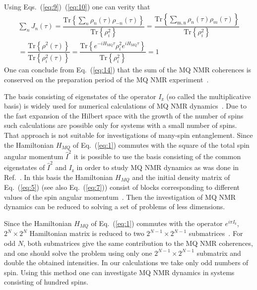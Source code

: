 \documentclass[review]{elsarticle}
\begin{document}
%
Using Eqs.~(\ref{eq:9})~(\ref{eq:10}) one can verity that 
%
\begin{multline}
    \label{eq:14}
    \sum\limits_{n} J_{n}(\tau)
    = \dfrac{
        \mathrm{Tr} \left\{
            \sum_{n} \rho_{n}(\tau) \rho_{-n}(\tau)
        \right\}}
    {\mathrm{Tr} \left\{ \rho^2_{i} \right\}} 
    = \dfrac{
        \mathrm{Tr} \left\{
            \sum_{\mathrm{m,n}} \rho_n(\tau)\rho_m(\tau)
    \right\}}
    {\mathrm{Tr} \left\{\rho^2_{i}\right\}}
    \\
    = \dfrac{
        \mathrm{Tr}\left\{\rho^2(\tau)\right\}
    }
    {
        \mathrm{Tr}\left\{\rho^2_{i}(\tau)\right\}
    }
    = \dfrac{
        \mathrm{Tr} \left\{ 
            e^{-i H_\mathrm{MQ} \tau} 
            \rho^{2}_{i}
            e^{i H_\mathrm{MQ} \tau} 
        \right\}
    }
    {
        \mathrm{Tr} \left\{ \rho_{i}^{2} \right\}
    } 
    = 1
\end{multline}
%
One can conclude from Eq.~(\ref{eq:14}) that the sum of the MQ NMR coherences is conserved on the preparation period of the MQ NMR experiment~\cite{Baum_1985}.

The basis consisting of eigenstates of the operator $I_\mathrm{z}$ (so called the multiplicative basis) is widely used for numerical calculations of MQ NMR dynamics~\cite{Zhang_2009}.
Due to the fast expansion of the Hilbert space with the growth of the number of spins such calculations are possible only for systems with a small number of spins.
That approach is not suitable for investigations of many-spin entanglement.
Since the Hamiltonian $H_{MQ}$ of Eq.~(\ref{eq:1}) commutes with the square of the total spin angular momentum $\hat I^2$ 
it is possible to use the basis consisting of the common eigenstates of $\hat I^2$ and $I_\mathrm{z}$ in order to study MQ NMR dynamics as was done in Ref.~\cite{Doronin_2009,Doronin_2011,Doronin_2019}.
In this basis the Hamiltonian $H_{MQ}$ and the initial density matrix of Eq.~(\ref{eq:5}) (see also Eq.~(\ref{eq:7})) consist of blocks corresponding to different values of the spin angular momentum~\cite{Doronin_2009}.
Then the investigation of MQ NMR dynamics can be reduced to solving a set of problems of less dimensions.

Since the Hamiltonian $H_{MQ}$ of Eq.~(\ref{eq:1}) commutes with the operator $e^{i\pi I_\mathrm{z}}$, $2^N \times 2^N$ Hamiltonian matrix is reduced to two $2^{N-1} \times 2^{N-1}$ submatrices~\cite{Doronin_2009}.
For odd $N$, both submatrices give the same contribution to the MQ NMR coherences, and one should solve the problem using only one $2^{N-1} \times 2^{N-1}$ submatrix and double the obtained intensities. 
In our calculations we take only odd numbers of spin.
Using this method one can investigate MQ NMR dynamics in systems consisting of hundred spins.
\end{document}
